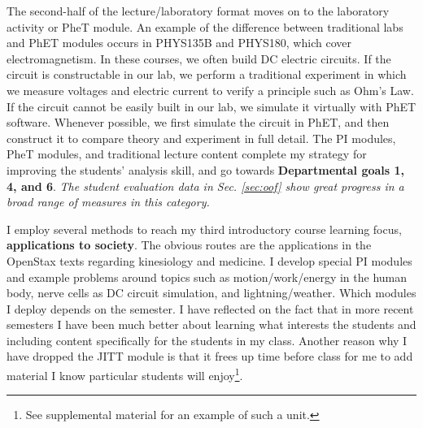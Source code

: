 \documentclass[../../../main.tex]{subfiles}
\begin{document}
The second-half of the lecture/laboratory format moves on to the laboratory activity or PheT module.  An example of the difference between traditional labs and PhET modules occurs in PHYS135B and PHYS180, which cover electromagnetism.  In these courses, we often build DC electric circuits.  If the circuit is constructable in our lab, we perform a traditional experiment in which we measure voltages and electric current to verify a principle such as Ohm's Law.  If the circuit cannot be easily built in our lab, we simulate it virtually with PhET software.  Whenever possible, we first simulate the circuit in PhET, and then construct it to compare theory and experiment in full detail.  The PI modules, PheT modules, and traditional lecture content complete my strategy for improving the students' analysis skill, and go towards \textbf{Departmental goals 1, 4, and 6}.  \textit{The student evaluation data in Sec. \ref{sec:oof} show great progress in a broad range of measures in this category.} \\ \hspace{0.1cm}

I employ several methods to reach my third introductory course learning focus, \textbf{applications to society}.  The obvious routes are the applications in the OpenStax texts \cite{openstax1} regarding kinesiology and medicine.  I develop special PI modules and example problems around topics such as motion/work/energy in the human body, nerve cells as DC circuit simulation, and lightning/weather.  Which modules I deploy depends on the semester.  I have reflected on the fact that in more recent semesters I have been much better about learning what interests the students and including content specifically for the students in my class.  Another reason why I have dropped the JITT module is that it frees up time before class for me to add material I know particular students will enjoy\footnote{See supplemental material for an example of such a unit.}. \\ \hspace{0.1cm}
\end{document}
